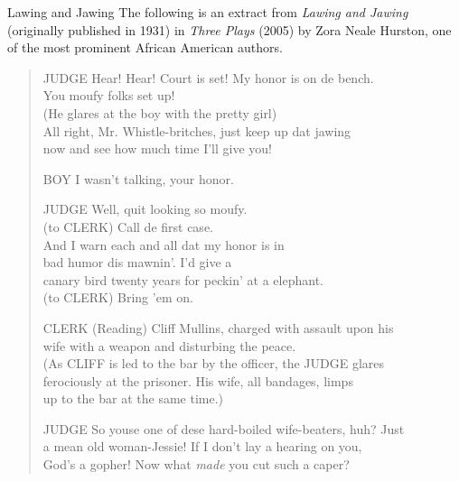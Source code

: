 \begin{texts}{Lawing and Jawing}
\label{LModE-texts}
The following is an extract from \emph{Lawing and Jawing} (originally published in 1931) in \textit{Three Plays} (2005) by Zora Neale Hurston, one of the most prominent African American authors.

\begin{quote}
    \internallinenumbers*{}
    JUDGE\phantom{XX} Hear! Hear! Court is set! My honor is on de bench.\\
    \phantom{JUDGEXX} You moufy folks set up!\\
    \phantom{JUDGEXX} (He glares at the boy with the pretty girl)\\
    \phantom{JUDGEXX} All right, Mr. Whistle-britches, just keep up dat jawing\\
    \phantom{JUDGEXX} now and see how much time I'll give you!

    BOY\phantom{XXXX} I wasn't talking, your honor.
    
    JUDGE\phantom{XX} Well, quit looking so moufy.\\
    \phantom{JUDGEXX} (to CLERK) Call de first case.\\
    \phantom{JUDGEXX} And I warn each and all dat my honor is in\\
    \phantom{JUDGEXX} bad humor dis mawnin'. I'd give a\\
    \phantom{JUDGEXX} canary bird twenty years for peckin' at a elephant.\\
    \phantom{JUDGEXX} (to CLERK) Bring 'em on.

    CLERK\phantom{XX} (Reading) Cliff Mullins, charged with assault upon his\\
    \phantom{CLERKXX} wife with a weapon and disturbing the peace.\\
    \phantom{CLERKXX} (As CLIFF is led to the bar by the officer, the JUDGE glares\\
    \phantom{CLERKXX} ferociously at the prisoner. His wife, all bandages, limps\\
    \phantom{CLERKXX} up to the bar at the same time.)

    JUDGE\phantom{XX} So youse one of dese hard-boiled wife-beaters, huh? Just\\
    \phantom{JUDGEXX} a mean old woman-Jessie! If I don't lay a hearing on you,\\
    \phantom{JUDGEXX} God's a gopher! Now what \emph{made} you cut such a caper?
\end{quote}
\end{texts}


